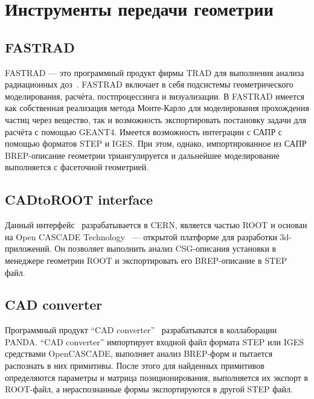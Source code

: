 \section{Инструменты передачи геометрии}\label{sec:ExistSols}

\subsection{FASTRAD}\label{sec:secFastrad}


FASTRAD --- это программный продукт фирмы TRAD для выполнения анализа радиационных доз~\cite{FASTRAD}.
FASTRAD включает в себя подсистемы геометрического моделирования, расчёта, постпроцессинга и визуализации.
В FASTRAD имеется как собственная реализация метода Монте-Карло для моделирования прохождения частиц через вещество, так и возможность экспортировать постановку задачи для расчёта с помощью GEANT4.
Имеется возможность интеграции с САПР с помощью форматов STEP и IGES. При этом, однако, импортированное из САПР BREP-описание геометрии триангулируется и дальнейшее моделирование выполняется с фасеточной геометрией.


\subsection{CADtoROOT interface}\label{sec:secCinzia}

Данный интерфейс~\cite{Cinzia} разрабатывается в CERN, является частью ROOT и основан на Open CASCADE Technology~\cite{OCCtech} --- открытой платформе для разработки 3d-приложений. Он позволяет выполнить анализ CSG-описания установки в менеджере геометрии ROOT и экспортировать его BREP-описание в STEP файл.

\subsection{CAD converter}\label{sec:secTobias}

Программный продукт ``CAD converter''~\cite{Tobias} разрабатыватся в коллаборации PANDA. ``CAD converter'' импортирует входной файл формата STEP или IGES средствами OpenCASCADE, выполняет анализ BREP-форм и пытается распознать в них примитивы. После этого для найденных примитивов определяются параметры и матрица позиционирования, выполняется их экспорт в ROOT-файл, а нераспознанные формы экспортируются в другой STEP файл.
